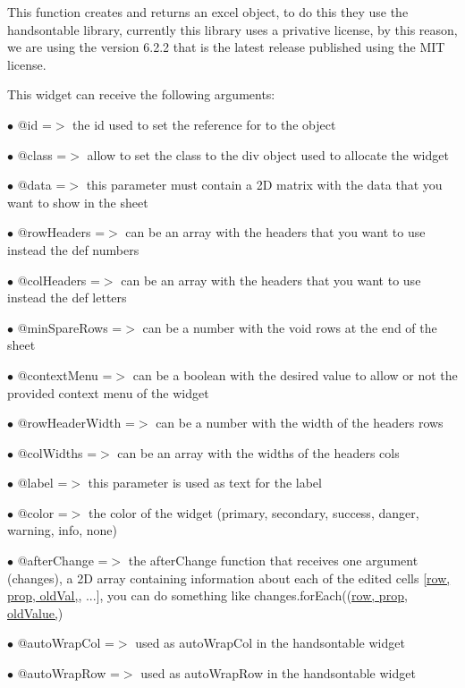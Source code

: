 \documentclass[a4paper]{article}
\def\htmladdnormallink#1#2{\href{#2}{#1}}
\begin{document}
This function creates and returns an excel object, to do this they use the handsontable library,
currently this library uses a privative license, by this reason, we are using the version 6.2.2
that is the latest release published using the MIT license.

This widget can receive the following arguments:

\begin{compactitem}
\item[\color{myblue}$\bullet$] @id             =$>$ the id used to set the reference for to the object
\item[\color{myblue}$\bullet$] @class          =$>$ allow to set the class to the div object used to allocate the widget
\item[\color{myblue}$\bullet$] @data           =$>$ this parameter must contain a 2D matrix with the data that you want to show
                   in the sheet
\item[\color{myblue}$\bullet$] @rowHeaders     =$>$ can be an array with the headers that you want to use instead the def numbers
\item[\color{myblue}$\bullet$] @colHeaders     =$>$ can be an array with the headers that you want to use instead the def letters
\item[\color{myblue}$\bullet$] @minSpareRows   =$>$ can be a number with the void rows at the end of the sheet
\item[\color{myblue}$\bullet$] @contextMenu    =$>$ can be a boolean with the desired value to allow or not the provided
                   context menu of the widget
\item[\color{myblue}$\bullet$] @rowHeaderWidth =$>$ can be a number with the width of the headers rows
\item[\color{myblue}$\bullet$] @colWidths      =$>$ can be an array with the widths of the headers cols
\item[\color{myblue}$\bullet$] @label          =$>$ this parameter is used as text for the label
\item[\color{myblue}$\bullet$] @color          =$>$ the color of the widget (primary, secondary, success, danger, warning, info, none)
\item[\color{myblue}$\bullet$] @afterChange    =$>$ the afterChange function that receives one argument (changes), a 2D array containing
                   information about each of the edited cells \htmladdnormallink{[row, prop, oldVal,}{newVal}, ...],
                   you can do something like changes.forEach((\htmladdnormallink{row, prop, oldValue,}{newValue})
\item[\color{myblue}$\bullet$] @autoWrapCol    =$>$ used as autoWrapCol in the handsontable widget
\item[\color{myblue}$\bullet$] @autoWrapRow    =$>$ used as autoWrapRow in the handsontable widget
\end{compactitem}
\end{document}
